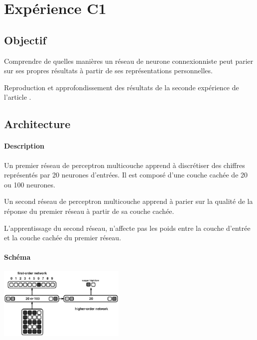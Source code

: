 \section{Expérience C1} \label{expC1}
  \subsection{Objectif}
    Comprendre de quelles manières un réseau de neurone connexionniste peut parier sur ses propres résultats
    à partir de ses représentations personnelles.
  
  
      Reproduction et approfondissement des résultats de la seconde expérience de l'article 
    \cite{Cleeremans_2007}. 
  
  \subsection{Architecture}
    \paragraph{Description}
      Un premier réseau de perceptron multicouche apprend à discrétiser des chiffres représentés
      par 20 neurones d'entrées. Il est composé d'une couche cachée de 20 ou 100 neurones.
      
      Un second réseau de perceptron multicouche apprend à parier sur la qualité de la réponse
      du premier réseau à partir de sa couche cachée.
      
      L'apprentissage du second réseau, n'affecte pas les poids entre la couche d'entrée et la 
      couche cachée du premier réseau.

    \paragraph{Schéma}
      \begin{center}
	\includegraphics[width=230px]{data/expC1/schema.png}
      \end{center}
      
